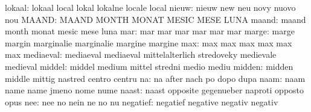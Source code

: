                    lokaal: lokaal                    local
                           lokal                     lokalne
                           locale                    local
                    nieuw: nieuw                     new
                           neu                       novy
                           nuovo                     nou
                    MAAND: MAAND                     MONTH
                           MONAT                     MESIC
                           MESE                      LUNA
                    maand: maand                     month
                           monat                     mesic
                           mese                      luna
                      mar: mar                       mar
                           mar                       mar
                           mar                       mar
                    marge: marge                     margin
                           marginalie                marginalie
                           margine                   margine
                      max: max                       max
                           max                       max
                           max                       max
                mediaeval: mediaeval                 mediaeval
                           mittelalterlich           stredoveky
                           medievale                 medieval
                   middel: middel                    medium
                           mittel                    stredni
                           medio                     mediu
                   midden: midden                    middle
                           mittig                    nastred
                           centro                    centru
                       na: na                        after
                           nach                      po
                           dopo                      dupa
                     naam: naam                      name
                           name                      jmeno
                           nome                      nume
                    naast: naast                     opposite
                           gegenueber                naproti
                           opposto                   opus
                      nee: nee                       no
                           nein                      ne
                           no                        nu
                 negatief: negatief                  negative
                           negativ                   negativ

